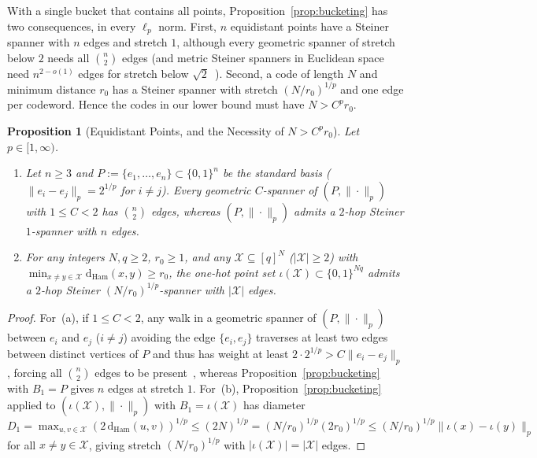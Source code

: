 \documentclass[11pt]{article}
\newtheorem{proposition}[theorem]{Proposition}
\theoremstyle{definition}
\theoremstyle{remark}
\newcommand{\Ham}{\mathrm{Ham}}
\newcommand{\dHam}{\mathrm{d}_{\Ham}}
\begin{document}
With a single bucket that contains all points, Proposition~\ref{prop:bucketing} has two consequences, in every $\ell_p$ norm. First, $n$ equidistant points have a Steiner spanner with $n$ edges and stretch $1$, although every geometric spanner of stretch below $2$ needs all $\binom{n}{2}$ edges (and metric Steiner spanners in Euclidean space need $n^{2 - o(1)}$ edges for stretch below $\sqrt{2}$~\cite{andoni2023subquadratic}). Second, a code of length $N$ and minimum distance $r_0$ has a Steiner spanner with stretch $(N / r_0)^{1/p}$ and one edge per codeword. Hence the codes in our lower bound must have $N > C^p r_0$.

\begin{proposition}[Equidistant Points, and the Necessity of $N > C^p r_0$]
\label{prop:simplex}
Let $p \in [1, \infty)$.
\begin{enumerate}[label=(\alph*),nosep]
  \item Let $n \ge 3$ and $P := \{e_1, \dots, e_n\} \subset \{0, 1\}^n$ be the standard basis ($\|e_i - e_j\|_p = 2^{1/p}$ for $i \ne j$). Every geometric $C$-spanner of $(P, \|\cdot\|_p)$ with $1 \le C < 2$ has $\binom{n}{2}$ edges, whereas $(P, \|\cdot\|_p)$ admits a $2$-hop Steiner $1$-spanner with $n$ edges.
  \item For any integers $N, q \ge 2$, $r_0 \ge 1$, and any $\mathcal{X} \subseteq [q]^N$ ($|\mathcal{X}| \ge 2$) with $\min_{x \ne y \in \mathcal{X}} \dHam(x, y) \ge r_0$, the one-hot point set $\iota(\mathcal{X}) \subset \{0, 1\}^{N q}$ admits a $2$-hop Steiner $(N / r_0)^{1/p}$-spanner with $|\mathcal{X}|$ edges.
\end{enumerate}
\end{proposition}

\begin{proof}
For~(a), if $1 \le C < 2$, any walk in a geometric spanner of $(P, \|\cdot\|_p)$ between $e_i$ and $e_j$ ($i \ne j$) avoiding the edge $\{e_i, e_j\}$ traverses at least two edges between distinct vertices of $P$ and thus has weight at least $2 \cdot 2^{1/p} > C \|e_i - e_j\|_p$, forcing all $\binom{n}{2}$ edges to be present~\cite{andoni2023subquadratic}, whereas Proposition~\ref{prop:bucketing} with $B_1 = P$ gives $n$ edges at stretch $1$. For~(b), Proposition~\ref{prop:bucketing} applied to $(\iota(\mathcal{X}), \|\cdot\|_p)$ with $B_1 = \iota(\mathcal{X})$ has diameter $D_1 = \max_{u, v \in \mathcal{X}} (2\,\dHam(u, v))^{1/p} \le (2 N)^{1/p} = (N / r_0)^{1/p} (2 r_0)^{1/p} \le (N / r_0)^{1/p} \|\iota(x) - \iota(y)\|_p$ for all $x \ne y \in \mathcal{X}$, giving stretch $(N / r_0)^{1/p}$ with $|\iota(\mathcal{X})| = |\mathcal{X}|$ edges.
\end{proof}
\end{document}
